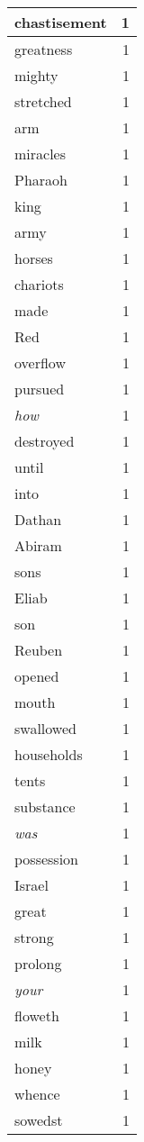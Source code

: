 \begin{center}
\begin{longtable}{l|r}
chastisement & 1 \\ \hline
greatness & 1 \\ \hline
mighty & 1 \\ \hline
stretched & 1 \\ \hline
arm & 1 \\ \hline
miracles & 1 \\ \hline
Pharaoh & 1 \\ \hline
king & 1 \\ \hline
army & 1 \\ \hline
horses & 1 \\ \hline
chariots & 1 \\ \hline
made & 1 \\ \hline
Red & 1 \\ \hline
overflow & 1 \\ \hline
pursued & 1 \\ \hline
\emph{how} & 1 \\ \hline
destroyed & 1 \\ \hline
until & 1 \\ \hline
into & 1 \\ \hline
Dathan & 1 \\ \hline
Abiram & 1 \\ \hline
sons & 1 \\ \hline
Eliab & 1 \\ \hline
son & 1 \\ \hline
Reuben & 1 \\ \hline
opened & 1 \\ \hline
mouth & 1 \\ \hline
swallowed & 1 \\ \hline
households & 1 \\ \hline
tents & 1 \\ \hline
substance & 1 \\ \hline
\emph{was} & 1 \\ \hline
possession & 1 \\ \hline
Israel & 1 \\ \hline
great & 1 \\ \hline
strong & 1 \\ \hline
prolong & 1 \\ \hline
\emph{your} & 1 \\ \hline
floweth & 1 \\ \hline
milk & 1 \\ \hline
honey & 1 \\ \hline
whence & 1 \\ \hline
sowedst & 1 \\ \hline

\end{longtable}
\end{center}
